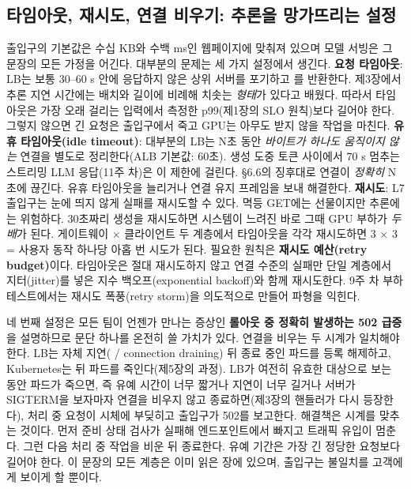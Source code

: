 \subsection*{타임아웃, 재시도, 연결 비우기: 추론을 망가뜨리는 설정}

출입구의 기본값은 수십 KB와 수백 ms인 웹페이지에 맞춰져 있으며 모델 서빙은 그 문장의 모든 가정을 어긴다. 대부분의 문제는 세 가지 설정에서 생긴다. \textbf{요청 타임아웃}: LB는 보통 30–60 s 안에 응답하지 않은 상위 서버를 포기하고 를 반환한다. 제3장에서 추론 지연 시간에는 배치와 길이에 비례해 치솟는 \textit{형태}가 있다고 배웠다. 따라서 타임아웃은 가장 오래 걸리는 입력에서 측정한 p99(제1장의 SLO 원칙)보다 길어야 한다. 그렇지 않으면 긴 요청은 출입구에서 죽고 GPU는 아무도 받지 않을 작업을 마친다. \textbf{유휴 타임아웃(idle timeout)}: 대부분의 LB는 N초 동안 \textit{바이트가 하나도 움직이지 않는} 연결을 별도로 정리한다(ALB 기본값: 60초). 생성 도중 토큰 사이에서 70 s 멈추는 스트리밍 LLM 응답(11주 차)은 이 제한에 걸린다. §6.6의 징후대로 연결이 \textit{정확히} N초에 끊긴다. 유휴 타임아웃을 늘리거나 연결 유지 프레임을 보내 해결한다. \textbf{재시도}: L7 출입구는 눈에 띄지 않게 실패를 재시도할 수 있다. 멱등 GET에는 선물이지만 추론에는 위험하다. 30초짜리 생성을 재시도하면 시스템이 느려진 바로 그때 GPU 부하가 \textit{두 배}가 된다. 게이트웨이 × 클라이언트 두 계층에서 타임아웃을 각각 재시도하면 3 × 3 = 사용자 동작 하나당 아홉 번 시도가 된다. 필요한 원칙은 \textbf{재시도 예산(retry budget)}이다. 타임아웃은 절대 재시도하지 않고 연결 수준의 실패만 단일 계층에서 지터(jitter)를 넣은 지수 백오프(exponential backoff)와 함께 재시도한다. 9주 차 부하 테스트에서는 재시도 폭풍(retry storm)을 의도적으로 만들어 파형을 익힌다.

네 번째 설정은 모든 팀이 언젠가 만나는 증상인 \textbf{롤아웃 중 정확히 발생하는 502 급증}을 설명하므로 문단 하나를 온전히 쓸 가치가 있다. 연결을 비우는 두 시계가 일치해야 한다. LB는 자체 지연( / connection draining) 뒤 종료 중인 파드를 등록 해제하고, Kubernetes는  뒤 파드를 죽인다(제5장의 과정). LB가 여전히 유효한 대상으로 보는 동안 파드가 죽으면, 즉 유예 시간이 너무 짧거나 지연이 너무 길거나 서버가 SIGTERM을 보자마자 연결을 비우지 않고 종료하면(제3장의 핸들러가 다시 등장한다), 처리 중 요청이 시체에 부딪히고 출입구가 502를 보고한다. 해결책은 시계를 맞추는 것이다. 먼저 준비 상태 검사가 실패해 엔드포인트에서 빠지고 트래픽 유입이 멈춘다. 그런 다음 처리 중 작업을 비운 뒤 종료한다. 유예 기간은 가장 긴 정당한 요청보다 길어야 한다. 이 문장의 모든 계층은 이미 읽은 장에 있으며, 출입구는 불일치를 고객에게 보이게 할 뿐이다.

